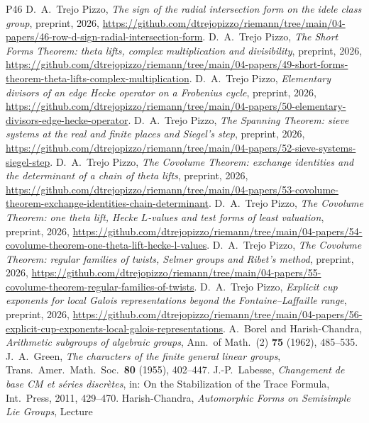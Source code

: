 \documentclass[10pt]{amsart}
\theoremstyle{definition}
\theoremstyle{remark}
\begin{document}
\begin{thebibliography}{P46}
 D.~A.~Trejo Pizzo, \emph{The sign of the radial intersection form on the idele class group}, preprint, 2026, \url{https://github.com/dtrejopizzo/riemann/tree/main/04-papers/46-row-d-sign-radial-intersection-form}.
 D.~A.~Trejo Pizzo, \emph{The Short Forms Theorem: theta lifts, complex multiplication and divisibility}, preprint, 2026, \url{https://github.com/dtrejopizzo/riemann/tree/main/04-papers/49-short-forms-theorem-theta-lifts-complex-multiplication}.
 D.~A.~Trejo Pizzo, \emph{Elementary divisors of an edge Hecke operator on a Frobenius cycle}, preprint, 2026, \url{https://github.com/dtrejopizzo/riemann/tree/main/04-papers/50-elementary-divisors-edge-hecke-operator}.
 D.~A.~Trejo Pizzo, \emph{The Spanning Theorem: sieve systems at the real and finite places and Siegel's step}, preprint, 2026, \url{https://github.com/dtrejopizzo/riemann/tree/main/04-papers/52-sieve-systems-siegel-step}.
 D.~A.~Trejo Pizzo, \emph{The Covolume Theorem: exchange identities and the determinant of a chain of theta lifts}, preprint, 2026, \url{https://github.com/dtrejopizzo/riemann/tree/main/04-papers/53-covolume-theorem-exchange-identities-chain-determinant}.
 D.~A.~Trejo Pizzo, \emph{The Covolume Theorem: one theta lift, Hecke $L$-values and test forms of least valuation}, preprint, 2026, \url{https://github.com/dtrejopizzo/riemann/tree/main/04-papers/54-covolume-theorem-one-theta-lift-hecke-l-values}.
 D.~A.~Trejo Pizzo, \emph{The Covolume Theorem: regular families of twists, Selmer groups and Ribet's method}, preprint, 2026, \url{https://github.com/dtrejopizzo/riemann/tree/main/04-papers/55-covolume-theorem-regular-families-of-twists}.
 D.~A.~Trejo Pizzo, \emph{Explicit cup exponents for local Galois representations beyond the Fontaine--Laffaille range}, preprint, 2026, \url{https://github.com/dtrejopizzo/riemann/tree/main/04-papers/56-explicit-cup-exponents-local-galois-representations}.
 A.~Borel and Harish-Chandra, \emph{Arithmetic subgroups of algebraic groups},
Ann.\ of Math.\ (2) \textbf{75} (1962), 485--535.
 J.~A.~Green, \emph{The characters of the finite general linear groups},
Trans.\ Amer.\ Math.\ Soc.\ \textbf{80} (1955), 402--447.
 J.-P.~Labesse, \emph{Changement de base CM et s\'eries discr\`etes}, in: On the
Stabilization of the Trace Formula, Int.\ Press, 2011, 429--470.
 Harish-Chandra, \emph{Automorphic Forms on Semisimple Lie Groups}, Lecture

\end{thebibliography}
\end{document}
